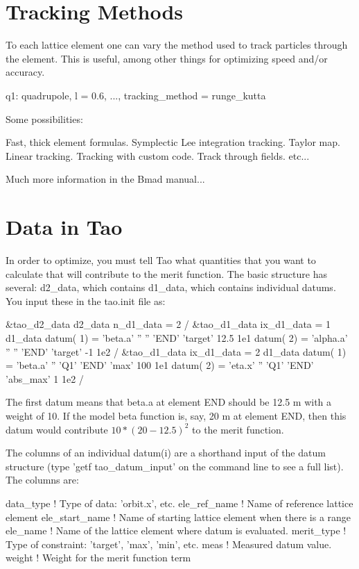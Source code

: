 \documentclass{hitec}
\newcommand{\Section}[1]{\section{#1}\vspace*{-1ex}}
\begin{document}
\Section{Tracking Methods}

To each lattice element one can vary the method used to track particles through the element. This is
useful, among other things for optimizing speed and/or accuracy.
{\small
\begin{code}
    q1: quadrupole, l = 0.6, ..., tracking_method = runge_kutta
\end{code}}

Some possibilities:
{\small
\begin{code}
   Fast, thick element formulas.
    Symplectic Lee integration tracking.
          Taylor map.
          Linear tracking.
          Tracking with custom code.
     Track through fields.
etc...
\end{code}}

Much more information in the Bmad manual...


\Section{Data in Tao}

In order to optimize, you must tell Tao what quantities that you want to calculate that will contribute to the merit function. The basic structure has several: d2_data, which contains d1_data, which contains individual datums. You input these in the tao.init file as:
{\small
\begin{code}
&tao_d2_data
    d2_data%
    n_d1_data = 2
/
&tao_d1_data
    ix_d1_data = 1
    d1_data%
    datum( 1) =  'beta.a'     '' '' 'END'   'target'  12.5   1e1  
    datum( 2) =  'alpha.a'    '' '' 'END'   'target'  -1     1e2
/ 
&tao_d1_data
    ix_d1_data = 2
    d1_data%
    datum( 1) =  'beta.a'    '' 'Q1' 'END'   'max'  100   1e1
    datum( 2) =  'eta.x'     '' 'Q1' 'END'   'abs_max'  1     1e2
/ 
\end{code}}

The first datum means that beta.a at element END should be 12.5 m with a weight of 10. If the model beta function is, say, 20 m at element END, then this datum would contribute $10*(20 - 12.5)^2$ to the merit function. 

The columns of an individual datum(i) are a shorthand input of the datum structure (type 'getf tao_datum_input' on the command line to see a full list). The columns are:
{\small
\begin{code}
data_type       ! Type of data: 'orbit.x', etc.
ele_ref_name    ! Name of reference lattice element
ele_start_name  ! Name of starting lattice element when there is a range
ele_name        ! Name of the lattice element where datum is evaluated.
merit_type      ! Type of constraint: 'target', 'max', 'min', etc.
meas            ! Measured datum value.
weight          ! Weight for the merit function term
\end{code}}
\end{document}
